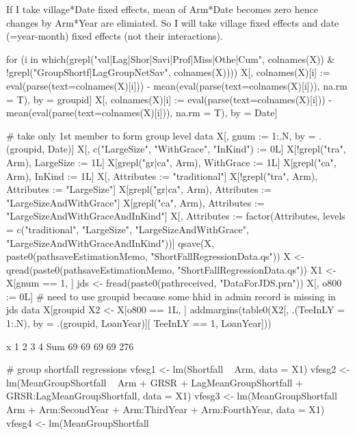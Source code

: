 If I take village*Date fixed effects, mean of Arm*Date becomes zero hence changes by Arm*Year are elimiated. So I will take village fixed effects and date (=year-month) fixed effects (not their interactions).
\begin{Schunk}
\begin{Sinput}
for (i in which(grepl("val|Lag|Shor|Savi|Prof|Miss|Othe|Cum", colnames(X)) & 
 !grepl("GroupShortf|LagGroupNetSav", colnames(X)))) {
  X[, colnames(X)[i] := eval(parse(text=colnames(X)[i])) - 
    mean(eval(parse(text=colnames(X)[i])), na.rm = T), 
    by = groupid]
  X[, colnames(X)[i] := eval(parse(text=colnames(X)[i])) - 
    mean(eval(parse(text=colnames(X)[i])), na.rm = T), 
    by = Date]
}
\end{Sinput}
\end{Schunk}
\begin{Schunk}
\begin{Sinput}
# take only 1st member to form group level data
X[, gnum := 1:.N, by = .(groupid, Date)]
X[, c("LargeSize", "WithGrace", "InKind") := 0L]
X[!grepl("tra", Arm), LargeSize := 1L]
X[grepl("gr|ca", Arm), WithGrace := 1L]
X[grepl("ca", Arm), InKind := 1L]
X[, Attributes := "traditional"]
X[!grepl("tra", Arm), Attributes := "LargeSize"]
X[grepl("gr|ca", Arm), Attributes := "LargeSizeAndWithGrace"]
X[grepl("ca", Arm), Attributes := "LargeSizeAndWithGraceAndInKind"]
X[, Attributes := factor(Attributes, levels = c("traditional", "LargeSize", 
  "LargeSizeAndWithGrace", "LargeSizeAndWithGraceAndInKind"))]
qsave(X, paste0(pathsaveEstimationMemo, "ShortFallRegressionData.qs"))
X <- qread(paste0(pathsaveEstimationMemo, "ShortFallRegressionData.qs"))
X1 <- X[gnum == 1, ]
jds <- fread(paste0(pathreceived, "DataForJDS.prn"))
X[, o800 := 0L]
# need to use groupid because some hhid in admin record is missing in jds data
X[groupid %in% jds[grepl("trea", treat), groupid], o800 := 1L]
X2 <- X[o800 == 1L, ]
addmargins(table0(X2[, .(TeeInLY = 1:.N), by = .(groupid, LoanYear)][
  TeeInLY == 1, LoanYear]))
\end{Sinput}
\begin{Soutput}
x
  1   2   3   4 Sum 
 69  69  69  69 276 
\end{Soutput}
\begin{Sinput}
# group shortfall regressions
vfesg1 <- lm(Shortfall  ~ Arm, data = X1)
vfesg2 <- lm(MeanGroupShortfall  ~ Arm +
  GRSR + LagMeanGroupShortfall + GRSR:LagMeanGroupShortfall, data = X1)
vfesg3 <- lm(MeanGroupShortfall ~  
  Arm + Arm:SecondYear + Arm:ThirdYear + Arm:FourthYear, 
  data = X1)
vfesg4 <- lm(MeanGroupShortfall ~  

\end{Sinput}
\end{Schunk}
